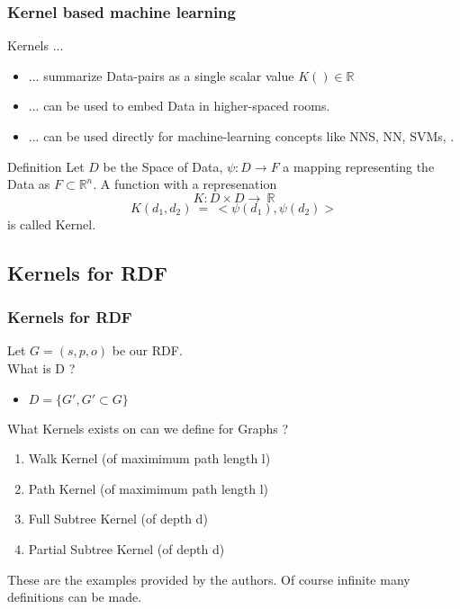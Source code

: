\begin{frame}[fragile,t]
\frametitle{Kernel based machine learning}
\begin{comment}
We want to consider a certain class of Machine learing Algorithms: Kernel based ones.
\end{comment}

Kernels ...
\begin{itemize}
\item ... summarize Data-pairs as a single scalar value $K()\in \mathbb{R}$
\pause
\item ... can be used to embed Data in higher-spaced rooms.
\pause
\item ... can be used directly for machine-learning concepts like NNS, NN, SVMs, .
\pause
\end{itemize}
\begin{block}{Definition}
Let $D$ be the Space of Data, $\psi: D \rightarrow F$ a mapping representing the Data as $F \subset \mathbb{R}^n$. A function with a represenation \\

\[ K: D \times  D  \rightarrow \ \mathbb{R}\]
\[ K(d_1,d_2)\ =\ <\psi(d_1),\psi(d_2)> \]
is called Kernel.
\end{block}

\end{frame}


\subsection{Kernels for RDF}
\begin{frame}[fragile, t]
\frametitle{Kernels for RDF}
Let $G = (s,p,o)$ be our RDF. \\
\pause
What is D ?
\begin{itemize} \pause
\item $D = \{G', G' \subset G\}$
\end{itemize}
What Kernels exists on can we define for Graphs ? \pause
\begin{enumerate}
\item Walk Kernel (of maximimum path length l)
\item Path Kernel (of maximimum path length l)
\item Full Subtree Kernel (of depth d)
\item Partial Subtree Kernel (of depth d)
\end{enumerate}
These are the examples provided by the authors. Of course infinite many definitions can be made.
\end{frame}

